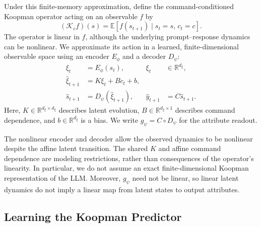 Under this finite-memory approximation, define the command-conditioned
Koopman operator acting on an observable $f$ by
\begin{equation}
    (\mathcal{K}_{c}f)(s)
    =
    \mathbb{E}\!\left[
        f(s_{t+1})
        \mid s_t=s,\,c_t=c
    \right].
    \label{eq:koopman_operator}
\end{equation}
The operator is linear in $f$, although the underlying prompt--response
dynamics can be nonlinear. We approximate its action in a learned,
finite-dimensional observable space using an encoder $E_{\phi}$ and
a decoder $D_{\psi}$:
\begin{equation}
    \begin{aligned}
        \xi_t
        &= E_{\phi}(s_t),
        & \xi_t &\in\mathbb{R}^{d_{\xi}},\\
        \widehat{\xi}_{t+1}
        &= K\xi_t+B c_t+b,\\
        \widehat{s}_{t+1}
        &= D_{\psi}(\widehat{\xi}_{t+1}),
        & \widehat{y}_{t+1}
        &= C\widehat{s}_{t+1}.
    \end{aligned}
    \label{eq:koopman_model}
\end{equation}
Here, $K\in\mathbb{R}^{d_{\xi}\times d_{\xi}}$ describes latent
evolution, $B\in\mathbb{R}^{d_{\xi}\times 1}$ describes command
dependence, and $b\in\mathbb{R}^{d_{\xi}}$ is a bias. We write
$g_{\psi}=C\circ D_{\psi}$ for the attribute readout.

The nonlinear encoder and decoder allow the observed dynamics to be
nonlinear despite the affine latent transition. The shared $K$ and
affine command dependence are modeling restrictions, rather than
consequences of the operator's linearity. In particular, we do not
assume an exact finite-dimensional Koopman representation of the LLM.
Moreover, $g_{\psi}$ need not be linear, so linear latent dynamics do
not imply a linear map from latent states to output attributes.

\subsection{Learning the Koopman Predictor}
\label{sec:learning}

